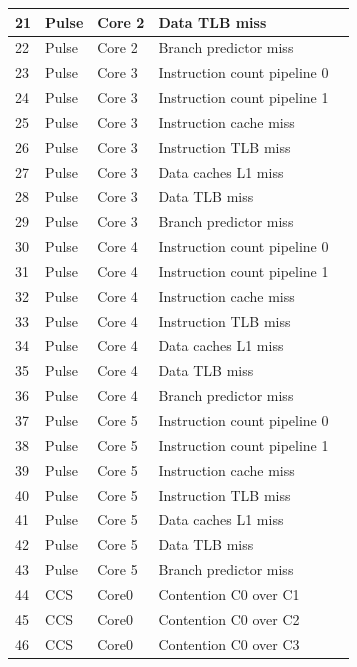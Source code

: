 \begin{table}[H]
\begin{tiny}
\begin{tabular}{|l|l|l|l|l|}
			\hline 
			21 & Pulse & Core 2 &  Data TLB miss \\
			\hline 
			22 & Pulse & Core 2 &  Branch predictor miss \\
			\hline 
			23 & Pulse & Core 3 &  Instruction count pipeline 0 \\
			\hline 
			24 & Pulse & Core 3 &  Instruction count pipeline 1 \\
			\hline 
			25 & Pulse & Core 3 &  Instruction cache miss \\
			\hline 
			26 & Pulse & Core 3 &  Instruction TLB miss \\
			\hline 
			27 & Pulse & Core 3 &  Data caches L1 miss \\
			\hline 
			28 & Pulse & Core 3 &  Data TLB miss \\
			\hline 
			29 & Pulse & Core 3 &  Branch predictor miss \\
			\hline 
			30 & Pulse & Core 4 &  Instruction count pipeline 0 \\
			\hline 
			31 & Pulse & Core 4 &  Instruction count pipeline 1 \\
			\hline 
			32 & Pulse & Core 4 &  Instruction cache miss \\
			\hline 
			33 & Pulse & Core 4 &  Instruction TLB miss \\
			\hline 
			34 & Pulse & Core 4 &  Data caches L1 miss \\
			\hline 
			35 & Pulse & Core 4 &  Data TLB miss \\
			\hline 
			36 & Pulse & Core 4 &  Branch predictor miss \\
			\hline 
			37 & Pulse & Core 5 &  Instruction count pipeline 0 \\
			\hline 
			38 & Pulse & Core 5 &  Instruction count pipeline 1 \\
			\hline 
			39 & Pulse & Core 5 &  Instruction cache miss \\
			\hline 
			40 & Pulse & Core 5 &  Instruction TLB miss \\
			\hline 
			41 & Pulse & Core 5 &  Data caches L1 miss \\
			\hline 
			42 & Pulse & Core 5 &  Data TLB miss \\
			\hline 
			43 & Pulse & Core 5 &  Branch predictor miss \\
			\hline 
			44 & CCS & Core0 &  Contention C0 over C1\\
			\hline 
			45 & CCS & Core0 &  Contention C0 over C2\\
			\hline 
			46 & CCS & Core0 &  Contention C0 over C3\\

\end{tabular}
\end{tiny}
\end{table}
